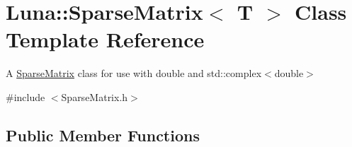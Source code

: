 \hypertarget{classLuna_1_1SparseMatrix}{}\section{Luna\+:\+:Sparse\+Matrix$<$ T $>$ Class Template Reference}
\label{classLuna_1_1SparseMatrix}


A \hyperlink{classLuna_1_1SparseMatrix}{Sparse\+Matrix} class for use with double and std\+::complex$<$double$>$  




{\ttfamily \#include $<$Sparse\+Matrix.\+h$>$}

\subsection*{Public Member Functions}

